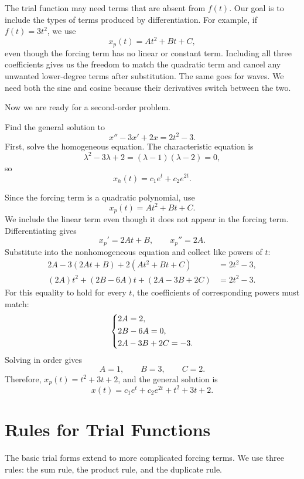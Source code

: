 \documentclass[10pt,letterpaper]{article}
\begin{document}
The trial function may need terms that are absent from $f(t)$.
Our goal is to include the types of terms produced by
differentiation. For example, if $f(t)=3t^2$, we use
\[
x_p(t)=At^2+Bt+C,
\]
even though the forcing term has no linear or constant term.
Including all three coefficients gives us the freedom to
match the quadratic term and cancel any unwanted lower-degree
terms after substitution. The same goes for waves. We need both 
the sine and cosine because their derivatives switch between the two. 

Now we are ready for a second-order problem.


\begin{example}[2]{
Find the general solution to
\[
x''-3x'+2x=2t^2-3.
\]
}
First, solve the homogeneous equation. The characteristic equation is
\[
\lambda^2-3\lambda+2=(\lambda-1)(\lambda-2)=0,
\]
so
\[
x_h(t)=c_1e^t+c_2e^{2t}.
\]

Since the forcing term is a quadratic polynomial, use
\[
x_p(t)=At^2+Bt+C.
\]
We include the linear term even though it does not appear
in the forcing term. Differentiating gives
\[
x_p'=2At+B,
\qquad
x_p''=2A.
\]
Substitute into the nonhomogeneous equation and collect
like powers of $t$:
\begin{align*}
2A-3(2At+B)+2(At^2+Bt+C)&=2t^2-3,\\
(2A)t^2+(2B-6A)t+(2A-3B+2C)&=2t^2-3.
\end{align*}
For this equality to hold for every $t$, the coefficients
of corresponding powers must match:
\[
\begin{dcases}
2A=2,\\
2B-6A=0,\\
2A-3B+2C=-3.
\end{dcases}
\]
Solving in order gives
\[
A=1,\qquad B=3,\qquad C=2.
\]
Therefore, $x_p(t)=t^2+3t+2$, and the general solution is
\[
\boxed{x(t)=c_1e^t+c_2e^{2t}+t^2+3t+2.}
\]
\end{example}


\section{Rules for Trial Functions}

The basic trial forms extend to more complicated forcing terms.
We use three rules: the sum rule, the product rule, and the
duplicate rule.
\end{document}
